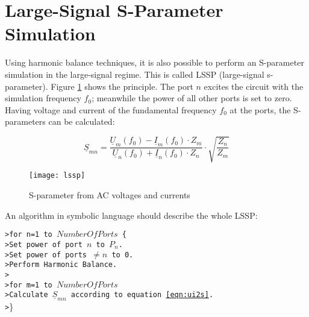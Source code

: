 \section{Large-Signal S-Parameter Simulation}

Using harmonic balance techniques, it is also possible to perform
an S-parameter simulation in the large-signal regime. This is called
LSSP (large-signal s-parameter). Figure \ref{fig:lssp} shows the
principle. The port $n$ excites the circuit with the simulation
frequency $f_0$; meanwhile the power of all other ports is set to
zero. Having voltage and current of the fundamental frequency $f_0$
at the ports, the S-parameters can be calculated:

\begin{equation}
\label{eqn:ui2s}
\underline{S}_{mn} = \frac{\underline{U}_m(f_0) - \underline{I}_m(f_0)\cdot Z_m}
                          {\underline{U}_n(f_0) + \underline{I}_n(f_0)\cdot Z_n}
		\cdot \sqrt{\frac{Z_n}{Z_m}}
\end{equation}

\begin{figure}[htb]
\begin{center}
\texttt{[image: lssp]}
\end{center}
\caption{S-parameter from AC voltages and currents}
\label{fig:lssp}
\end{figure}
\FloatBarrier

An algorithm in symbolic language should describe the whole LSSP:

\addvspace{12pt}

\texttt{>\quad for n=1 to $NumberOfPorts$ \{} \\
\texttt{>\quad \qquad Set power of port $n$ to $P_n$.} \\
\texttt{>\quad \qquad Set power of ports $\ne n$ to 0.} \\
\texttt{>\quad \qquad Perform Harmonic Balance.} \\
\texttt{>\quad \qquad } \\
\texttt{>\quad \qquad for m=1 to $NumberOfPorts$} \\
\texttt{>\quad \qquad \qquad Calculate $\underline{S}_{mn}$ according to equation \ref{eqn:ui2s}.} \\
\texttt{>\quad }\}
